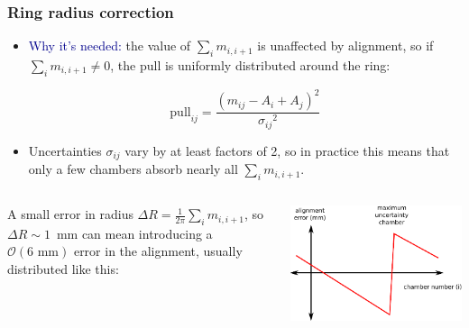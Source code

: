 \documentclass[compress]{beamer}
\begin{document}
\begin{frame}
\frametitle{Ring radius correction}
\begin{itemize}
\item \textcolor{darkblue}{Why it's needed:} the value of $\sum_i m_{i,i+1}$ is unaffected
  by alignment, so if $\sum_i m_{i,i+1} \ne 0$, the pull is uniformly
  distributed around the ring:

\[ \mbox{pull}_{ij} = \frac{(m_{ij} - A_i + A_j)^2}{{\sigma_{ij}}^2} \]

\item Uncertainties $\sigma_{ij}$ vary by at least factors of 2, so in
  practice this means that only a few chambers absorb nearly all
  $\sum_i m_{i,i+1}$.

\end{itemize}

\begin{columns}
A small error in radius $\displaystyle \Delta R = \frac{1}{2\pi} \sum_i m_{i,i+1}$, so $\Delta R \sim 1$~mm can mean introducing a $\mathcal{O}(6\mbox{ mm})$ error in the alignment, usually distributed like this:

\includegraphics[width=\linewidth]{distribution_of_errors.pdf}
\end{columns}
\end{frame}
\end{document}
